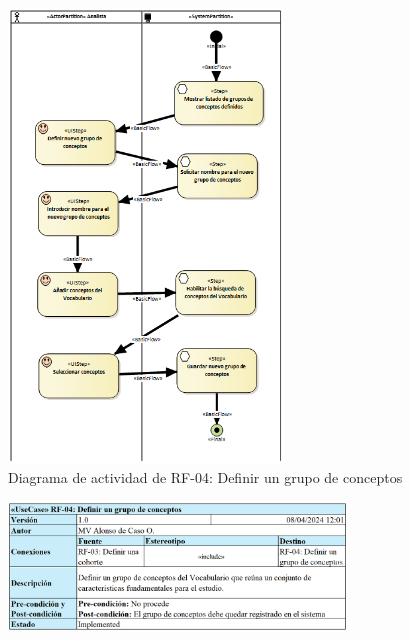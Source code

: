 \begin{figure}[H]
    \centering
    \includegraphics[width=0.65\textwidth]{figures/FR04.png}
    \caption{Diagrama de actividad de RF-04: Definir un grupo de conceptos}
    \label{fig:FR04}
\end{figure}

\begin{figure}[H]
    \centering
    \includegraphics[width=0.80\textwidth]{tables/RF04tab.png}
    \label{table:RF04tab}
\end{figure}

